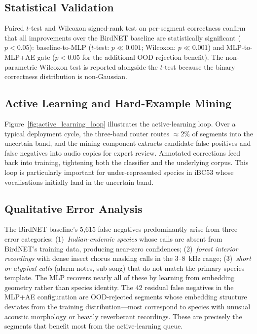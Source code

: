 \documentclass[conference]{IEEEtran}
\begin{document}
\subsection{Statistical Validation}

Paired $t$-test and Wilcoxon signed-rank test on per-segment correctness confirm that all improvements over the BirdNET baseline are statistically significant ($p < 0.05$): baseline-to-MLP ($t$-test: $p \ll 0.001$; Wilcoxon: $p \ll 0.001$) and MLP-to-MLP+AE gate ($p < 0.05$ for the additional OOD rejection benefit). The non-parametric Wilcoxon test is reported alongside the $t$-test because the binary correctness distribution is non-Gaussian.

\subsection{Active Learning and Hard-Example Mining}

Figure~\ref{fig:active_learning_loop} illustrates the active-learning loop. Over a typical deployment cycle, the three-band router routes $\approx 2\%$ of segments into the uncertain band, and the mining component extracts candidate false positives and false negatives into audio copies for expert review. Annotated corrections feed back into training, tightening both the classifier and the underlying corpus. This loop is particularly important for under-represented species in iBC53 whose vocalisations initially land in the uncertain band.

\subsection{Qualitative Error Analysis}

The BirdNET baseline's 5,615 false negatives predominantly arise from three error categories: (1)~\textit{Indian-endemic species} whose calls are absent from BirdNET's training data, producing near-zero confidences; (2)~\textit{forest interior recordings} with dense insect chorus masking calls in the 3--8~kHz range; (3)~\textit{short or atypical calls} (alarm notes, sub-song) that do not match the primary species template. The MLP recovers nearly all of these by learning from embedding geometry rather than species identity. The 42 residual false negatives in the MLP+AE configuration are OOD-rejected segments whose embedding structure deviates from the training distribution---most correspond to species with unusual acoustic morphology or heavily reverberant recordings. These are precisely the segments that benefit most from the active-learning queue.
\end{document}
